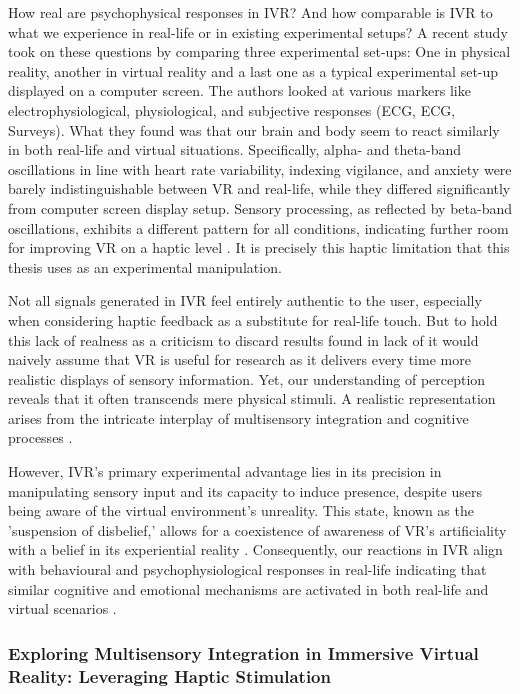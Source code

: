\documentclass[12pt,oneside,openright]{report}
\begin{document}
How real are psychophysical responses in IVR? And how comparable is IVR to what we experience in real-life or in existing experimental setups? A recent study took on these questions by comparing three experimental set-ups: One in physical reality, another in virtual reality and a last one as a typical experimental set-up displayed on a computer screen. The authors looked at various markers like electrophysiological, physiological, and subjective responses (ECG, ECG, Surveys). What they found was that our brain and body seem to react similarly in both real-life and virtual situations. Specifically, alpha- and theta-band oscillations in line with heart rate variability, indexing vigilance, and anxiety were barely indistinguishable between VR and real-life, while they differed significantly from computer screen display setup. Sensory processing, as reflected by beta-band oscillations, exhibits a different pattern for all conditions, indicating further room for improving VR on a haptic level \parencite{Schne2023TheRO}. It is precisely this haptic limitation that this thesis uses as an experimental manipulation. 

Not all signals generated in IVR feel entirely authentic to the user, especially when considering haptic feedback as a substitute for real-life touch. But to hold this lack of realness as a criticism to discard results found in lack of it would naively assume that VR  is useful for research as it delivers every time more realistic displays of sensory information. Yet, our understanding of perception reveals that it often transcends mere physical stimuli. A realistic representation arises from the intricate interplay of multisensory integration and cognitive processes \parencite{deGelder2018VirtualRA}. 

However, IVR's primary experimental advantage lies in its precision in manipulating sensory input and its capacity to induce presence, despite users being aware of the virtual environment's unreality. This state, known as the 'suspension of disbelief,' allows for a coexistence of awareness of VR's artificiality with a belief in its experiential reality \parencite{Slater2009PlaceIA}. Consequently, our reactions in IVR align with behavioural and psychophysiological responses in real-life indicating that similar cognitive and emotional mechanisms are activated in both real-life and virtual scenarios \parencite{Vasser2020GuidelinesFI, deGelder2018VirtualRA}.

\subsubsection*{Exploring Multisensory Integration in Immersive Virtual Reality: Leveraging Haptic Stimulation}
\end{document}
